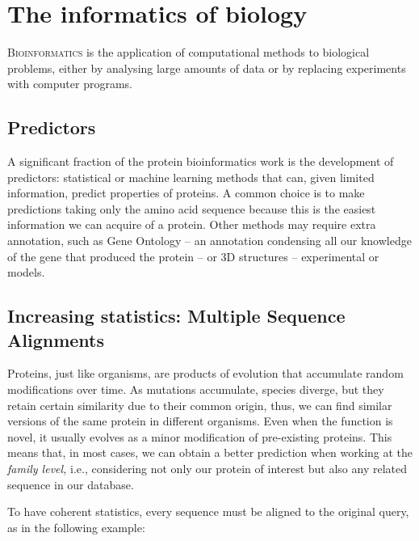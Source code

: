 \chapter{The informatics of biology}
\lettrine[lines=3, lhang=0.3, nindent=0em]{\color{Maroon}B}{ioinformatics}
is the application of computational methods to biological problems,
either by analysing large amounts of data or by replacing experiments with computer programs.

\section{Predictors}
A significant fraction of the protein bioinformatics work is the development of predictors: 
statistical or machine learning methods that can, given limited information, predict properties of proteins.
A common choice is to make predictions taking only the amino acid sequence because this is the easiest information we can acquire of a protein.
Other methods may require extra annotation, such as Gene Ontology -- an annotation condensing all our knowledge of the gene that produced the protein -- or 3D structures -- experimental or models.

\section[Multiple Sequence Alignments]{Increasing statistics: Multiple Sequence Alignments}
Proteins, just like organisms, are products of evolution that accumulate random modifications over time.
As mutations accumulate, species diverge, but they retain certain similarity due to their common origin, thus, we can find similar versions of the same protein in different organisms.
Even when the function is novel, it usually evolves as a minor modification of pre-existing proteins.
This means that, in most cases, we can obtain a better prediction when working at the \emph{family level,}
i.e., considering not only our protein of interest but also any related sequence in our database.

To have coherent statistics, every sequence must be aligned to the original query, as in the following example:

